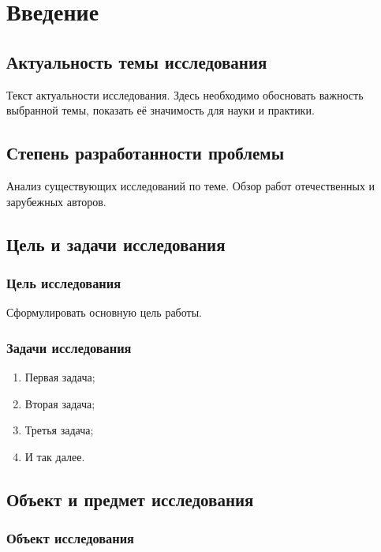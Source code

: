\chapter{Введение}

\section{Актуальность темы исследования}

Текст актуальности исследования. Здесь необходимо обосновать важность выбранной темы, показать её значимость для науки и практики.

\section{Степень разработанности проблемы}

Анализ существующих исследований по теме. Обзор работ отечественных и зарубежных авторов.

\section{Цель и задачи исследования}

\subsection{Цель исследования}

Сформулировать основную цель работы.

\subsection{Задачи исследования}

\begin{enumerate}
    \item Первая задача;
    \item Вторая задача;
    \item Третья задача;
    \item И так далее.
\end{enumerate}

\section{Объект и предмет исследования}

\subsection{Объект исследования}

